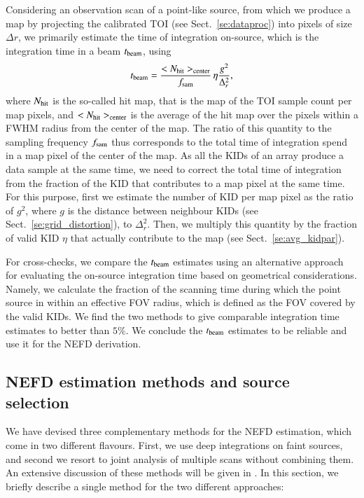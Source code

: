 Considering an observation scan of a point-like source, from which we
produce a map by projecting the calibrated TOI (see
Sect.~\ref{se:dataproc}) into pixels of size $\Delta r$, we primarily
estimate the time of integration on-source, which is the integration
time in a beam $t_{\rm{beam}}$, using
%
\begin{equation}
  t_{\rm{beam}} = \frac{<N_{\rm{hit}}>_{\rm{center}}}{f_{\rm{sam}}}\,
  \eta \frac{g^2}{\Delta_r^2},
  \label{eq:integration_time}
\end{equation}
%
where $N_{\rm{hit}}$ is the so-called hit map, that is the map of the
TOI sample count per map pixels, and $<N_{\rm{hit}}>_{\rm{center}}$
is the average of the hit map over the pixels within a FWHM radius
from the center of the map. The ratio of this quantity to the sampling
frequency $f_{\rm{sam}}$ thus corresponds to the total time of integration
spend in a map pixel of the center of the map. As all the KIDs of an
array produce a data sample at the same time, we need to correct the
total time of integration from the fraction of the KID that
contributes to a map pixel at the same time. For this purpose, first
we estimate the number of KID per map pixel as the ratio of $g^2$,
where $g$ is the distance between neighbour KIDs (see
Sect.~\ref{se:grid_distortion}), to $\Delta_r^2$. Then, we multiply
this quantity by the fraction of valid KID $\eta$ that actually
contribute to the map (see Sect.~\ref{se:avg_kidpar}). 

For cross-checks, we compare the $t_{\rm{beam}}$ estimates using an
alternative approach for evaluating the on-source integration
time based on geometrical considerations. Namely, we calculate the
fraction of the scanning time during which the point source in within
an effective FOV radius, which is defined as the FOV covered by the
valid KIDs. We find the two methods to give comparable integration
time estimates to better than $5\%$. We conclude the $t_{\rm{beam}}$
estimates to be reliable and use it for the NEFD derivation.  


\subsection{NEFD estimation methods and source selection}
\label{se:nefd_method}

We have devised three complementary methods for the
NEFD estimation, which come in two different flavours. First, we
use deep integrations on faint sources, and second we resort to 
joint analysis of multiple scans without combining them. An
extensive discussion of these methods will be given in
\citet{Ponthieu2019}. In this section, we briefly describe a single method
for the two different approaches: \\


